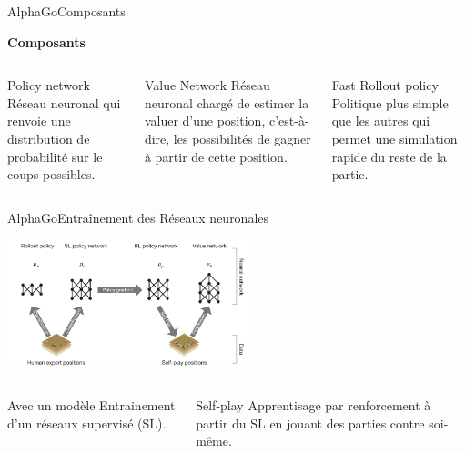 \begin{frame}{AlphaGo}{Composants}
    \begin{center}
        \textbf{Composants}
    \end{center}
    \begin{columns}[t]
        \begin{column}{.3\textwidth}
            \begin{block}{Policy network}
                Réseau neuronal qui renvoie une distribution de probabilité sur le coups possibles.
            \end{block}
        \end{column}
        \begin{column}{.3\textwidth}
            \begin{block}{Value Network}
                Réseau neuronal chargé de estimer la valuer d'une position, c'est-à-dire, les possibilités de gagner à partir de cette position.
            \end{block}
        \end{column}
        \begin{column}{.3\textwidth}
            \begin{block}{Fast Rollout policy}
                Politique plus simple que les autres qui permet une simulation rapide du reste de la partie.
            \end{block}
        \end{column}
    \end{columns}
\end{frame}

\begin{frame}{AlphaGo}{Entraînement des Réseaux neuronales}
    \begin{center}
        \includegraphics[width=7cm]{ressources/AlphaGo/Entrainement}
        \begin{columns}[t]
            \begin{column}{.4\textwidth}
                \begin{block}{Avec un modèle}
                    Entrainement d'un réseaux supervisé (SL).
                \end{block}
            \end{column}
            \begin{column}{.4\textwidth}
                \begin{block}{Self-play}
                    Apprentisage par renforcement à partir du SL en jouant des parties contre soi-même.
                \end{block}
            \end{column}
        \end{columns}

    \end{center}
\end{frame}


